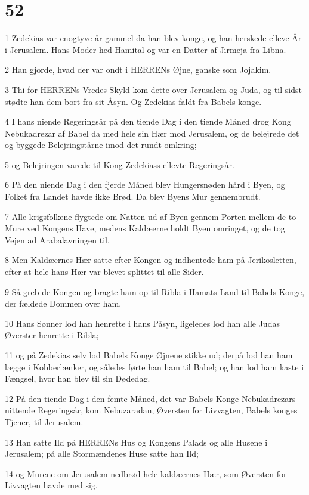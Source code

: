 \chapter{52}

\par 1 Zedekias var enogtyve år gammel da han blev konge, og han herskede elleve År i Jerusalem. Hans Moder hed Hamital og var en Datter af Jirmeja fra Libna.
\par 2 Han gjorde, hvad der var ondt i HERRENs Øjne, ganske som Jojakim.
\par 3 Thi for HERRENs Vredes Skyld kom dette over Jerusalem og Juda, og til sidst stødte han dem bort fra sit Åsyn. Og Zedekias faldt fra Babels konge.
\par 4 I hans niende Regeringsår på den tiende Dag i den tiende Måned drog Kong Nebukadrezar af Babel da med hele sin Hær mod Jerusalem, og de belejrede det og byggede Belejringstårne imod det rundt omkring;
\par 5 og Belejringen varede til Kong Zedekiass ellevte Regeringsår.
\par 6 På den niende Dag i den fjerde Måned blev Hungersnøden hård i Byen, og Folket fra Landet havde ikke Brød. Da blev Byens Mur gennembrudt.
\par 7 Alle krigsfolkene flygtede om Natten ud af Byen gennem Porten mellem de to Mure ved Kongens Have, medens Kaldæerne holdt Byen omringet, og de tog Vejen ad Arabalavningen til.
\par 8 Men Kaldæernes Hær satte efter Kongen og indhentede ham på Jerikosletten, efter at hele hans Hær var blevet splittet til alle Sider.
\par 9 Så greb de Kongen og bragte ham op til Ribla i Hamats Land til Babels Konge, der fældede Dommen over ham.
\par 10 Hans Sønner lod han henrette i hans Påsyn, ligeledes lod han alle Judas Øverster henrette i Ribla;
\par 11 og på Zedekias selv lod Babels Konge Øjnene stikke ud; derpå lod han ham lægge i Kobberlænker, og således førte han ham til Babel; og han lod ham kaste i Fængsel, hvor han blev til sin Dødedag.
\par 12 På den tiende Dag i den femte Måned, det var Babels Konge Nebukadrezars nittende Regeringsår, kom Nebuzaradan, Øversten for Livvagten, Babels konges Tjener, til Jerusalem.
\par 13 Han satte Ild på HERRENs Hus og Kongens Palads og alle Husene i Jerusalem; på alle Stormændenes Huse satte han Ild;
\par 14 og Murene om Jerusalem nedbrød hele kaldæernes Hær, som Øversten for Livvagten havde med sig.
